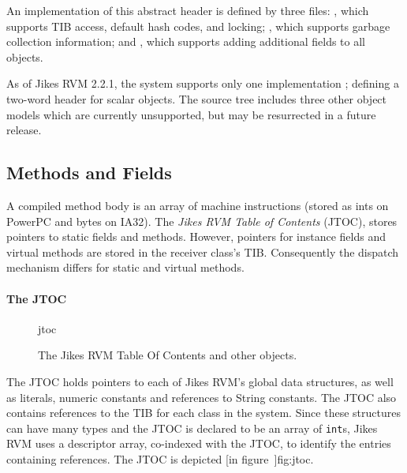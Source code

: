 An implementation of this abstract header is defined by three files: 
, which supports
TIB access, default hash codes, and locking; 
, which
supports garbage collection information; 
and 
, which supports
adding additional fields to all objects. 

As of Jikes RVM 2.2.1, the system supports only one implementation
; 
defining a two-word header for scalar objects.  The source tree includes
three other object models which are currently unsupported, but may be
resurrected in a future release.

\subsection{Methods and Fields}\label{sssec:methods}
A compiled method body is an array of machine instructions (stored as
ints on PowerPC and bytes on IA32). 
The {\em Jikes RVM Table of Contents} (JTOC),
stores pointers to static fields and methods.  However, 
pointers for instance fields and virtual methods are stored in the receiver 
class's TIB.  Consequently the dispatch mechanism differs for static and virtual 
methods.

\paragraph{The JTOC}
\begin{figure}[htb]
\begin{gif}{jtoc}
\vbox{
\hbox{}
}\hfil
\end{gif}
\caption{The Jikes RVM Table Of Contents and other objects.}
\label{fig:jtoc}
\end{figure}
The JTOC holds pointers to 
each of Jikes\TMweb{} RVM's global data structures, as well as
literals, numeric constants and references to String constants.
The JTOC also
contains references to the TIB for each class in the system.  
Since these 
structures can have many types and the JTOC is declared to be an array of 
{\tt int}s,  
Jikes RVM uses a descriptor array, co-indexed with the JTOC, 
to identify the entries containing references.
The JTOC
is depicted [in figure~\Ref]{fig:jtoc}.  

